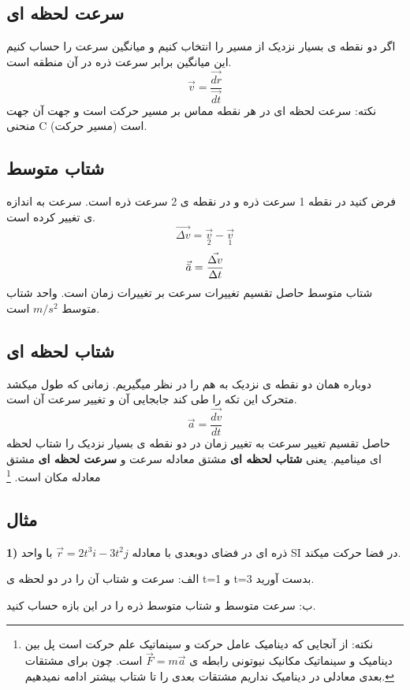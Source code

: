 \documentclass[12px, a4paper, oneside]{article}
\begin{document}
\subsection*{سرعت لحظه ای}
اگر دو نقطه ی بسیار نزدیک از مسیر را انتخاب کنیم و میانگین سرعت را حساب کنیم این میانگین برابر سرعت ذره در آن منطقه است.
\[ \vec{v} = \frac{\vec{dr}}{\vec{dt}}\]
نکته: سرعت لحظه ای در هر نقطه مماس بر مسیر حرکت است و جهت آن جهت منحنی C (مسیر حرکت) است.

\subsection*{شتاب متوسط}
فرض کنید در نقطه 1 سرعت ذره 
و در نقطه ی 2 سرعت ذره 
است. سرعت به اندازه ی
تغییر کرده است.
\[\vec{\Delta{v}} = \vec{\underset{2}{v}} - \vec{\underset{1}{v}}\]
\[\vec{\bar{a}} = \frac{\vec{\Delta{v}}}{\Delta{t}}\]
شتاب متوسط حاصل تقسیم تغییرات سرعت بر تغییرات زمان است. واحد شتاب متوسط $m/s^2$ است.
\subsection*{شتاب لحظه ای}
دوباره همان دو نقطه ی نزدیک به هم را در نظر میگیریم. زمانی که طول میکشد متحرک این تکه را طی کند 
جابجایی آن 
و تغییر سرعت آن 
است.
\[\vec{a} = \frac{\vec{dv}}{dt}\]
حاصل تقسیم تغییر سرعت به تغییر زمان در دو نقطه ی بسیار نزدیک را شتاب لحظه ای مینامیم.
یعنی
{\bf شتاب لحظه ای}
مشتق معادله سرعت و 
{\bf سرعت لحظه ای}
مشتق معادله مکان است.
\footnote[2]{نکته:  از آنجایی که دینامیک عامل حرکت و سینماتیک علم حرکت است پل بین دینامیک و سینماتیک مکانیک نیوتونی رابطه ی $\vec{F} = m\vec{a}$ است. چون برای مشتقات بعدی معادلی در دینامیک نداریم مشتقات بعدی را تا شتاب بیشتر ادامه نمیدهیم.}
\subsection*{مثال}

{\bf 1)}
ذره ای در فضای دوبعدی با معادله $\vec{r} = 2t^3i - 3t^2j $ با واحد SI در فضا حرکت میکند.
\begin{list}{}{}
    \item الف: سرعت و شتاب آن را در دو لحظه ی t=1 و t=3 بدست آورید.
    \item ب: سرعت متوسط و شتاب متوسط ذره را در این بازه حساب کنید.
    
\end{list}
\end{document}
